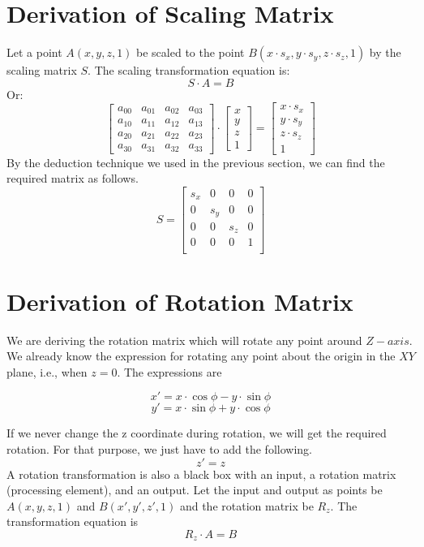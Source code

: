 \section{Derivation of Scaling Matrix}
Let a point \(A(x, y, z, 1)\) be scaled to the point \(B(x \cdot s_x, y \cdot s_y, z \cdot s_z, 1)\) by the scaling matrix \(S\).
The scaling transformation equation is: \[S \cdot A = B \]
Or:
\[
\begin{bmatrix}
a_{00} & a_{01} & a_{02} & a_{03} \\
a_{10} & a_{11} & a_{12} & a_{13} \\
a_{20} & a_{21} & a_{22} & a_{23} \\
a_{30} & a_{31} & a_{32} & a_{33}
\end{bmatrix}
\cdot
\begin{bmatrix}
x \\
y \\
z \\
1
\end{bmatrix}
=
\begin{bmatrix}
x \cdot s_x \\
y \cdot s_y \\
z  \cdot s_z \\
1
\end{bmatrix}
\]
By the deduction technique we used in the previous section, we can find the required matrix as follows.
\begin{equation}
S =
\begin{bmatrix}
s_x & 0  & 0  & 0 \\
0 & s_y  & 0  & 0 \\
0 & 0  & s_z  & 0 \\
0 & 0  & 0     & 1 \\
\end{bmatrix}
\end{equation}

\section{Derivation of Rotation Matrix}
We are deriving the rotation matrix which will rotate any point around \(Z-axis\). We already know the expression for rotating any point about the origin in the \(XY\) plane, i.e., when \(z=0\). The expressions are 

\[
 x' = x \cdot \cos \phi - y \cdot \sin \phi 
\]
\[
y' = x \cdot \sin \phi + y \cdot \cos \phi
\]

If we never change the z coordinate during rotation, we will get the required rotation. For that purpose, we just have to add the following.
 \[
 z' = z
 \]
A rotation transformation is also a black box with an input, a rotation matrix (processing element), and an output. Let the input and output as points be \(A(x, y, z, 1)\) and \(B(x', y', z', 1)\) and the rotation matrix be \(R_z\).
The transformation equation is \[R_z \cdot A = B \]

